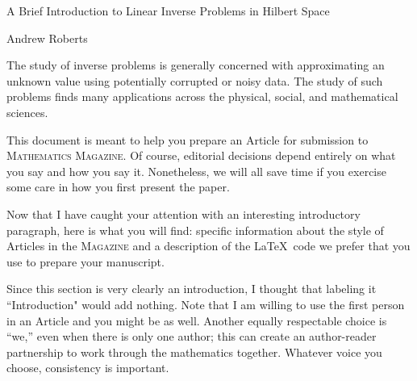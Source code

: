 \documentclass[12pt]{article}
\begin{document}
\begin{center}
\Large
A Brief Introduction to Linear Inverse Problems in Hilbert Space
\end{center}

\begin{flushright}
Andrew Roberts
\end{flushright} 

The study of inverse problems is generally concerned with approximating 
an unknown value using potentially corrupted or noisy data. The study of 
such problems finds many applications across the physical, social, and 
mathematical sciences. 

This document is meant to help you prepare an Article for
submission to \textsc{Mathematics Magazine}.  Of course,
editorial decisions depend entirely on
what you say and how you say it. Nonetheless, we will all save
time if you exercise some care in how you first present the paper.

Now that I have caught your attention with an interesting introductory paragraph,
here is what you will find:
specific information about the style of Articles in the \textsc{Magazine}
and a description of the \LaTeX\ code we prefer that you use
to prepare your manuscript.

Since this section is very clearly
an introduction, I thought that labeling it ``Introduction" would add
nothing.  Note that I am willing to use the first person in an Article
and you might be as well.  Another equally respectable choice is ``we,''
even when there is only one author; this can
create an author-reader partnership to
work through the mathematics together.
Whatever voice you choose, consistency is important.
\end{document}
